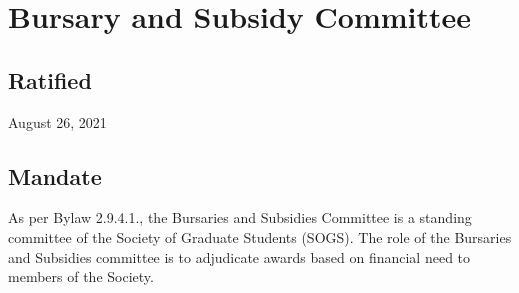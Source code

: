 \section{Bursary and Subsidy Committee}

\subsection{Ratified}
August 26, 2021

\subsection{Mandate}
As per Bylaw 2.9.4.1., the Bursaries and Subsidies Committee is a standing committee of the Society of Graduate Students (SOGS). The role of the Bursaries and Subsidies committee is to adjudicate awards based on financial need to members of the Society.

